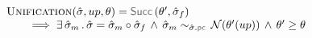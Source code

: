 
\newcommand{\unificationfunction}{\textsc{Unification}}
\newcommand{\extendedunificationfunction}{\underline{\textsc{Unification}}}
\newcommand{\emptystate}{\emptyset}
\newcommand{\stateequiv}{\sim}
\newcommand{\stateequivrel}[3]{#1 \sim_{#3} #2}




\begin{lemma}
$$
\begin{array}{l}
\unificationfunction(\sstate, \up, \subst) = \success{\subst', \sstate_f} \\ \quad \quad
  \implies 
   \exists \, \sstate_m \, . \, 
   \sstate = \sstate_m \statecompose \sstate_f 
   \, \wedge \, 
    \stateequivrel{\sstate_m}{\normaliser(\subst'(\up))}{\sstate.\pcsel}
     \, \wedge \, 
     \subst' \fextends \subst
\end{array}
$$
\end{lemma}
